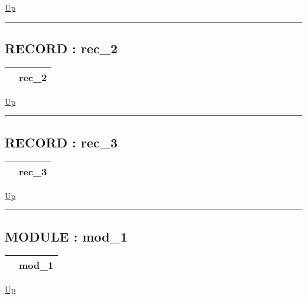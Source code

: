 \hyperlink{ecldoc:intest.example_2}{Up}

\par


\rule{\textwidth}{0.4pt}
\subsection*{RECORD : rec\_2}
\hypertarget{ecldoc:intest.example_2.rec_2}{}

{\renewcommand{\arraystretch}{1.5}
\begin{tabularx}{\textwidth}{|>{\raggedright\arraybackslash}l|X|}
\hline
\hspace{0pt} & rec\_2 \\
\hline
\end{tabularx}
}

\hyperlink{ecldoc:intest.example_2}{Up}

\par


\rule{\textwidth}{0.4pt}
\subsection*{RECORD : rec\_3}
\hypertarget{ecldoc:intest.example_2.rec_3}{}

{\renewcommand{\arraystretch}{1.5}
\begin{tabularx}{\textwidth}{|>{\raggedright\arraybackslash}l|X|}
\hline
\hspace{0pt} & rec\_3 \\
\hline
\end{tabularx}
}

\hyperlink{ecldoc:intest.example_2}{Up}

\par


\rule{\textwidth}{0.4pt}
\subsection*{MODULE : mod\_1}
\hypertarget{ecldoc:intest.example_2.mod_1}{}

{\renewcommand{\arraystretch}{1.5}
\begin{tabularx}{\textwidth}{|>{\raggedright\arraybackslash}l|X|}
\hline
\hspace{0pt} & mod\_1 \\
\hline
\end{tabularx}
}

\hyperlink{ecldoc:intest.example_2}{Up}

\par


